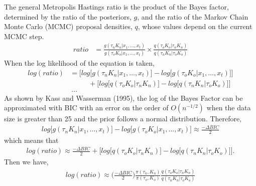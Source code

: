 \documentclass[submit]{smj}
\begin{document}
The general Metropolis Hastings ratio is the product of the Bayes factor, determined by the ratio of the posteriors, $g$, and the ratio of the Markov Chain Monte Carlo (MCMC) proposal densities, $q$, whose values depend on the current MCMC step. 
\begin{align*}
ratio &= \frac{g(\tau_{n} K_{n} | x_1,\dots,x_t) }{g(\tau_{o} K_{o} | x_1,\dots,x_t)} \times \frac{q(\tau_{o} K_{o} | \tau_{n} K_{n})}{q(\tau_{n} K_{n}| \tau_{o} K_{o})}
\end{align*}
When the log likelihood of the equation is taken, 
\begin{align*}
log(ratio) & =\Big[ log \big[ g(\tau_{n} K_{n} | x_1,\dots,x_t)
\big] - log \big[ g(\tau_{o} K_{o} | x_1,\dots,x_t)\big] \Big] \\
& \ \ \ \ \ \ \ \ \ \ \ \ + 
\Big[ log \big[ q(\tau_{o} K_{o} | \tau_{n} K_{n}) \big] - log \big[ q(\tau_{n} K_{n}| \tau_{o} K_{o})  \big] \Big] \\
& \ …
\end{align*}
As shown by Kass and Wasserman (1995), the log of the Bayes Factor can be approximated with BIC with an error on the order of $O(n^{-1/2})$ when the data size is greater than 25 and the prior follows a normal distribution.
Therefore, 
\begin{align*}
 log \big[ g(\tau_{n} K_{n} | x_1,\dots,x_t)
\big] - log \big[ g(\tau_{o} K_{o} | x_1,\dots,x_t)\big]  \approx \frac{- \Delta BIC}{2} 
\end{align*}
which means that 
\begin{align*}
log(ratio) \approx \frac{- \Delta BIC}{2} + 
\Big[ log \big[ q(\tau_{o} K_{o} | \tau_{n} K_{n}) \big] - log \big[ q(\tau_{n} K_{n}| \tau_{o} K_{o})  \big] \Big].
\end{align*}
Then we have,
\begin{align*}
log(ratio) \approx \Big( \frac{- \Delta BIC}{2}\Big) \frac{\pi (\tau_n,K_n)}{\pi(\tau_o,K_o)} \frac{q(\tau_o K_o | \tau_nK_n)}{q(\tau_n K_n | \tau_oK_o)}
\end{align*}
\end{document}
